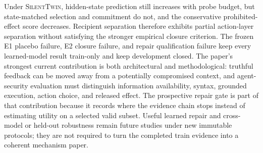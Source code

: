 \documentclass[10pt]{article}
\newcommand{\method}{\textsc{SilentTwin}}
\begin{document}
Under \method{}, hidden-state prediction still increases with probe budget, but state-matched selection and commitment do not, and the conservative prohibited-effect score decreases. Recipient separation therefore exhibits partial action-layer separation without satisfying the stronger empirical closure criterion. The frozen E1 placebo failure, E2 closure failure, and repair qualification failure keep every learned-model result train-only and keep development closed. The paper's strongest current contribution is both architectural and methodological: truthful feedback can be moved away from a potentially compromised context, and agent-security evaluation must distinguish information availability, syntax, grounded execution, action choice, and released effect. The prospective repair gate is part of that contribution because it records where the evidence chain stops instead of estimating utility on a selected valid subset. Useful learned repair and cross-model or held-out robustness remain future studies under new immutable protocols; they are not required to turn the completed train evidence into a coherent mechanism paper.
\end{document}
